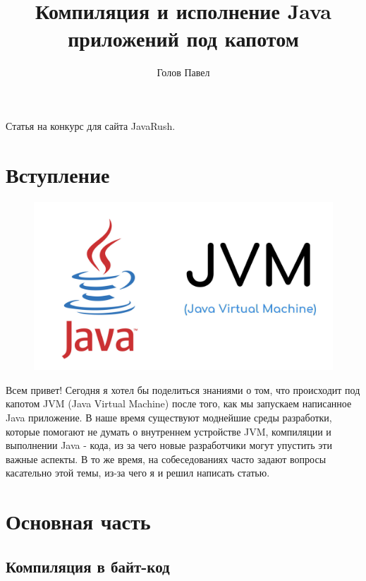 \documentclass[]{scrartcl}
\title{Компиляция и исполнение Java приложений под капотом}
\author{Голов Павел}
\begin{document}
\maketitle

\begin{center}
	Статья на конкурс для сайта JavaRush.
\end{center}

\thispagestyle{empty}

\newpage

\section{Вступление}

\begin{figure}[h]
	\includegraphics[width=\linewidth]{JVM.jpg}
\end{figure}

Всем привет! Сегодня я хотел бы поделиться знаниями о том, что происходит под капотом JVM (Java Virtual Machine) после того, как мы запускаем написанное Java приложение. В наше время существуют моднейшие среды разработки, которые помогают не думать о внутреннем устройстве JVM, компиляции и выполнении Java - кода, из за чего новые разработчики могут упустить эти важные аспекты. В то же время, на собеседованиях часто задают вопросы касательно этой темы,  из-за чего я и решил написать статью.

\section{Основная часть}

\subsection{Компиляция в байт-код}
\end{document}
